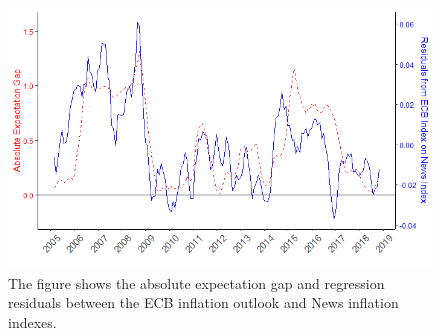 \documentclass[review]{elsarticle}
\begin{document}
   \begin{figure}[!ht]
    \centering
    \includegraphics{abs_exp_res.png}
\caption{The figure shows the absolute expectation gap and regression residuals between the ECB inflation outlook and News inflation indexes.}
    \label{Abs_exp_res}
    \end{figure}
\end{document}
